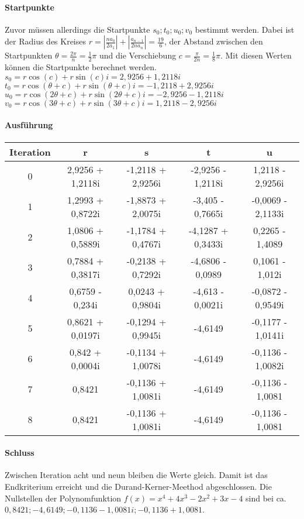 \documentclass[12pt]{article}
\begin{document}
\paragraph{Startpunkte}
Zuvor müssen allerdings die Startpunkte $s_0;t_0;u_0;v_0$ bestimmt werden. Dabei ist der Radius des Kreises $r = |\frac{na_0}{2a_1}| + |\frac{a_{n-1}}{2na_n}| = \frac{19}{6}$, der Abstand zwischen den Startpunkten $\theta = \frac{2\pi}{n} = \frac{1}{2}\pi$ und die Verschiebung $c = \frac{\pi}{2n} = \frac{1}{8}\pi$. Mit diesen Werten können die Startpunkte berechnet werden. \\
$s_0 = r \cos(c) + r \sin(c)i = 2,9256 + 1,2118i$ \\
$t_0 = r \cos(\theta+c) + r \sin(\theta+c)i = -1,2118 + 2,9256i$ \\
$u_0 = r \cos(2\theta+c) + r \sin(2\theta+c)i = -2,9256 - 1,2118i$ \\
$v_0 = r \cos(3\theta+c) + r \sin(3\theta+c)i = 1,2118 - 2,9256i$

\paragraph{Ausführung}
\begin{center}
\begin{tabular}{c|c c c c}
    Iteration & r & s & t & u \\
    \hline
    0 & 2,9256 + 1,2118i & -1,2118 + 2,9256i & -2,9256 - 1,2118i & 1,2118 - 2,9256i \\
    1 & 1,2993 + 0,8722i & -1,8873 + 2,0075i & -3,405 - 0,7665i & -0,0069 - 2,1133i \\
    2 & 1,0806 + 0,5889i & -1,1784 + 0,4767i & -4,1287 + 0,3433i & 0,2265 - 1,4089 \\
    3 & 0,7884 + 0,3817i & -0,2138 + 0,7292i & -4,6806 - 0,0989 & 0,1061 - 1,012i \\
    4 & 0,6759 - 0,234i & 0,0243 + 0,9804i & -4,613 - 0,0021i & -0,0872 - 0,9549i \\
    5 & 0,8621 + 0,0197i & -0,1294 + 0,9945i & -4,6149 & -0,1177 - 1,0141i \\
    6 & 0,842 + 0,0004i & -0,1134 + 1,0078i & -4,6149 & -0,1136 - 1,0082i \\
    7 & 0,8421 & -0,1136 + 1,0081i & -4,6149 & -0,1136 - 1,0081 \\
    8 & 0,8421 & -0,1136 + 1,0081i & -4,6149 & -0,1136 - 1,0081 \\
\end{tabular}
\end{center}
\paragraph{Schluss}
Zwischen Iteration acht und neun bleiben die Werte gleich. Damit ist das Endkriterium erreicht und die Durand-Kerner-Meethod abgeschlossen. Die Nullstellen der Polynomfunktion $f(x) = x^4 + 4x^3 - 2x^2 + 3x - 4$ sind bei ca. $0,8421; -4,6149; -0,1136 - 1,0081i; -0,1136 + 1,0081$. 
\end{document}
